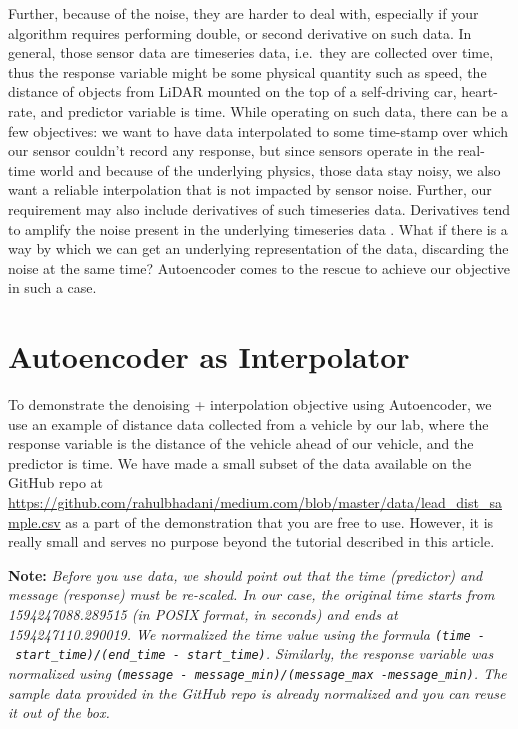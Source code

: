 \documentclass[onecolumn]{article}
\begin{document}
Further, because of the noise, they are harder to deal with, especially
if your algorithm requires performing double, or second derivative on
such data. In general, those sensor data are timeseries data, i.e.~they
are collected over time, thus the response variable might be some
physical quantity such as speed, the distance of objects from LiDAR
mounted on the top of a self-driving car, heart-rate, and predictor
variable is time. While operating on such data, there can be a few
objectives: we want to have data interpolated to some time-stamp over
which our sensor couldn't record any response, but since sensors operate
in the real-time world and because of the underlying physics, those data
stay noisy, we also want a reliable interpolation that is not impacted
by sensor noise. Further, our requirement may also include derivatives
of such timeseries data. Derivatives tend to amplify the noise present
in the underlying timeseries data \citep{bhadani2019real}. What if there
is a way by which we can get an underlying representation of the data,
discarding the noise at the same time? Autoencoder comes to the rescue
to achieve our objective in such a case.

\section{Autoencoder as Interpolator}\label{autoencoder-as-interpolator}

To demonstrate the denoising + interpolation objective using
Autoencoder, we use an example of distance data collected from a vehicle
by our lab, where the response variable is the distance of the vehicle
ahead of our vehicle, and the predictor is time. We have made a small
subset of the data available on the GitHub repo at
\url{https://github.com/rahulbhadani/medium.com/blob/master/data/lead_dist_sample.csv}
as a part of the demonstration that you are free to use. However, it is
really small and serves no purpose beyond the tutorial described in this
article.

\textbf{Note:} \emph{Before you use data, we should point out that the
time (predictor) and message (response) must be re-scaled. In our case,
the original time starts from 1594247088.289515 (in POSIX format, in
seconds) and ends at 1594247110.290019. We normalized the time value
using the formula
\texttt{(time\ -\ start\_time)/(end\_time\ -\ start\_time)}. Similarly,
the response variable was normalized using
\texttt{(message\ -\ message\_min)/(message\_max\ -message\_min)}. The
sample data provided in the GitHub repo is already normalized and you
can reuse it out of the box.}
\end{document}
